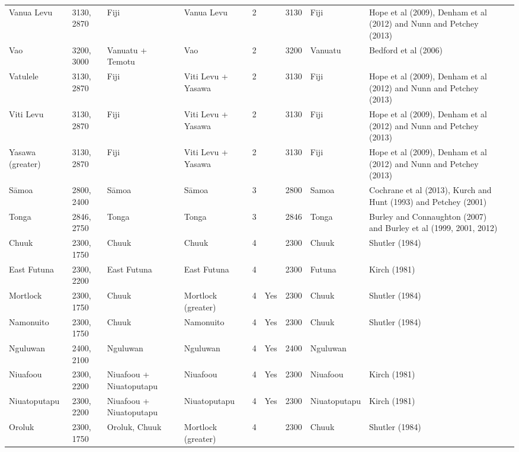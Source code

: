 \begin{longtable}{p{2cm}p{2cm}p{2cm}p{2cm}p{2cm}p{2cm}p{2cm}p{2cm}p{2cm}p{2cm}}
  Vanua Levu & 3130, 2870 & Fiji & Vanua Levu & 2 &  & 3130 & Fiji & Hope et al (2009), Denham et al (2012) and Nunn and Petchey (2013) & \citet{rieth_cochrane_2018} \\ 
  Vao & 3200, 3000 & Vanuatu + Temotu & Vao & 2 &  & 3200 & Vanuatu & Bedford et al (2006) & \citet{rieth_cochrane_2018} \\ 
  Vatulele & 3130, 2870 & Fiji & Viti Levu + Yasawa & 2 &  & 3130 & Fiji & Hope et al (2009), Denham et al (2012) and Nunn and Petchey (2013) & \citet{rieth_cochrane_2018} \\ 
  Viti Levu & 3130, 2870 & Fiji & Viti Levu + Yasawa & 2 &  & 3130 & Fiji & Hope et al (2009), Denham et al (2012) and Nunn and Petchey (2013) & \citet{rieth_cochrane_2018} \\ 
  Yasawa (greater) & 3130, 2870 & Fiji & Viti Levu + Yasawa & 2 &  & 3130 & Fiji & Hope et al (2009), Denham et al (2012) and Nunn and Petchey (2013) & \citet{rieth_cochrane_2018} \\ 
  Sāmoa & 2800, 2400 & Sāmoa & Sāmoa & 3 &  & 2800 & Samoa & Cochrane et al (2013), Kurch and Hunt (1993) and Petchey (2001) & \citet{rieth_cochrane_2018} \\ 
  Tonga & 2846, 2750 & Tonga & Tonga & 3 &  & 2846 & Tonga & Burley and Connaughton (2007) and Burley et al (1999, 2001, 2012) & \citet{rieth_cochrane_2018} \\ 
  Chuuk & 2300, 1750 & Chuuk & Chuuk & 4 &  & 2300 & Chuuk & Shutler (1984) & \citet{rieth_cochrane_2018} \\ 
  East Futuna & 2300, 2200 & East Futuna & East Futuna & 4 &  & 2300 & Futuna & Kirch (1981) & \citet{rieth_cochrane_2018} \\ 
  Mortlock & 2300, 1750 & Chuuk & Mortlock (greater) & 4 & Yes & 2300 & Chuuk & Shutler (1984) & \citet{rieth_cochrane_2018} \\ 
  Namonuito & 2300, 1750 & Chuuk & Namonuito & 4 & Yes & 2300 & Chuuk & Shutler (1984) & \citet{rieth_cochrane_2018} \\ 
  Nguluwan & 2400, 2100 & Nguluwan & Nguluwan & 4 & Yes & 2400 & Nguluwan & \citet{Napolitano_et_al_yap} &  \\ 
  Niuafoou & 2300, 2200 & Niuafoou + Niuatoputapu & Niuafoou & 4 & Yes & 2300 & Niuafoou & Kirch (1981) & \citet{rieth_cochrane_2018} \\ 
  Niuatoputapu & 2300, 2200 & Niuafoou + Niuatoputapu & Niuatoputapu & 4 & Yes & 2300 & Niuatoputapu & Kirch (1981) & \citet{rieth_cochrane_2018} \\ 
  Oroluk & 2300, 1750 & Oroluk, Chuuk & Mortlock (greater) & 4 &  & 2300 & Chuuk & Shutler (1984) & \citet{rieth_cochrane_2018} \\ 

\end{longtable}

